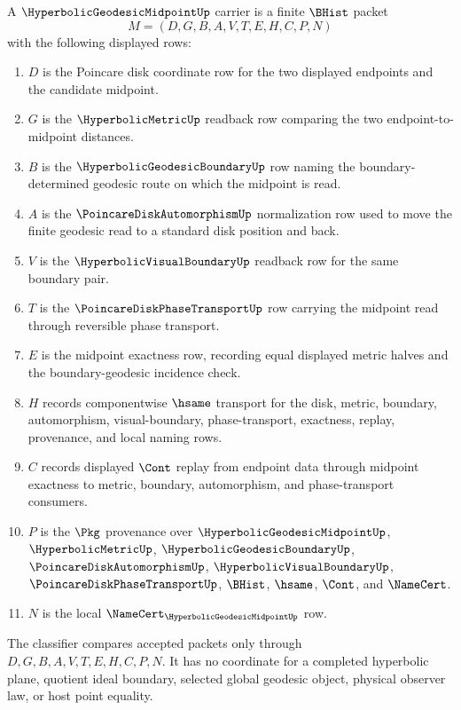 \begin{definition}
\label{def:hyperbolic-geodesic-midpoint-carrier}
A $\HyperbolicGeodesicMidpointUp$ carrier is a finite $\BHist$ packet
$$
M=(D,G,B,A,V,T,E,H,C,P,N)
$$
with the following displayed rows:
\begin{enumerate}
\item $D$ is the Poincare disk coordinate row for the two displayed endpoints and the candidate midpoint.
\item $G$ is the $\HyperbolicMetricUp$ readback row comparing the two endpoint-to-midpoint distances.
\item $B$ is the $\HyperbolicGeodesicBoundaryUp$ row naming the boundary-determined geodesic route on which the midpoint is read.
\item $A$ is the $\PoincareDiskAutomorphismUp$ normalization row used to move the finite geodesic read to a standard disk position and back.
\item $V$ is the $\HyperbolicVisualBoundaryUp$ readback row for the same boundary pair.
\item $T$ is the $\PoincareDiskPhaseTransportUp$ row carrying the midpoint read through reversible phase transport.
\item $E$ is the midpoint exactness row, recording equal displayed metric halves and the boundary-geodesic incidence check.
\item $H$ records componentwise $\hsame$ transport for the disk, metric, boundary, automorphism, visual-boundary, phase-transport, exactness, replay, provenance, and local naming rows.
\item $C$ records displayed $\Cont$ replay from endpoint data through midpoint exactness to metric, boundary, automorphism, and phase-transport consumers.
\item $P$ is the $\Pkg$ provenance over $\HyperbolicGeodesicMidpointUp$, $\HyperbolicMetricUp$, $\HyperbolicGeodesicBoundaryUp$, $\PoincareDiskAutomorphismUp$, $\HyperbolicVisualBoundaryUp$, $\PoincareDiskPhaseTransportUp$, $\BHist$, $\hsame$, $\Cont$, and $\NameCert$.
\item $N$ is the local $\NameCert_{\HyperbolicGeodesicMidpointUp}$ row.
\end{enumerate}
The classifier compares accepted packets only through $D,G,B,A,V,T,E,H,C,P,N$. It has no coordinate for a completed hyperbolic plane, quotient ideal boundary, selected global geodesic object, physical observer law, or host point equality.
\end{definition}

